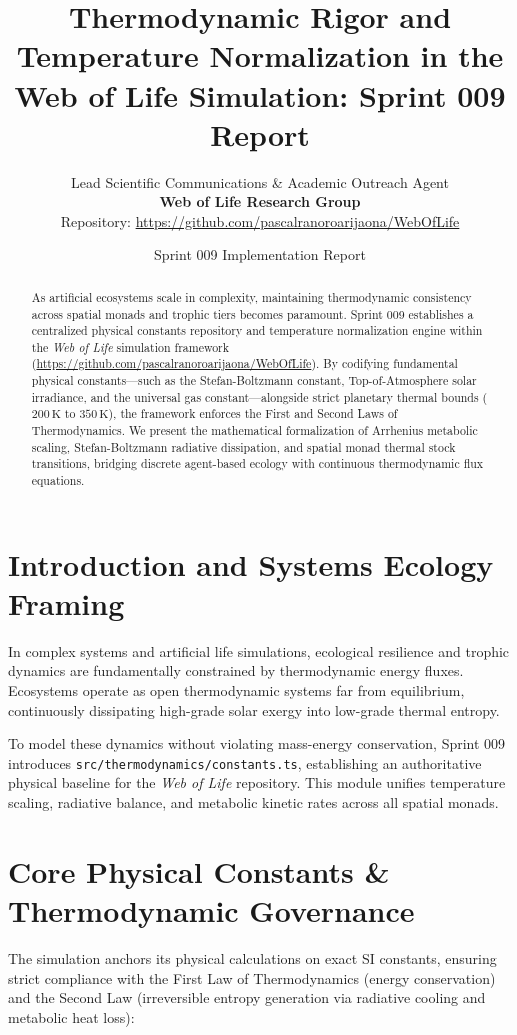\documentclass[11pt, a4paper]{article}
\title{\textbf{Thermodynamic Rigor and Temperature Normalization in the Web of Life Simulation: Sprint 009 Report}}
\author{
    Lead Scientific Communications \& Academic Outreach Agent \\
    \textbf{Web of Life Research Group} \\
    Repository: \url{https://github.com/pascalranoroarijaona/WebOfLife}
}
\date{Sprint 009 Implementation Report}
\begin{document}
\maketitle

\begin{abstract}
As artificial ecosystems scale in complexity, maintaining thermodynamic consistency across spatial monads and trophic tiers becomes paramount. Sprint 009 establishes a centralized physical constants repository and temperature normalization engine within the \textit{Web of Life} simulation framework (\url{https://github.com/pascalranoroarijaona/WebOfLife}). By codifying fundamental physical constants---such as the Stefan-Boltzmann constant, Top-of-Atmosphere solar irradiance, and the universal gas constant---alongside strict planetary thermal bounds ($200\,\text{K}$ to $350\,\text{K}$), the framework enforces the First and Second Laws of Thermodynamics. We present the mathematical formalization of Arrhenius metabolic scaling, Stefan-Boltzmann radiative dissipation, and spatial monad thermal stock transitions, bridging discrete agent-based ecology with continuous thermodynamic flux equations.
\end{abstract}

\section{Introduction and Systems Ecology Framing}
In complex systems and artificial life simulations, ecological resilience and trophic dynamics are fundamentally constrained by thermodynamic energy fluxes. Ecosystems operate as open thermodynamic systems far from equilibrium, continuously dissipating high-grade solar exergy into low-grade thermal entropy. 

To model these dynamics without violating mass-energy conservation, Sprint 009 introduces \texttt{src/thermodynamics/constants.ts}, establishing an authoritative physical baseline for the \textit{Web of Life} repository. This module unifies temperature scaling, radiative balance, and metabolic kinetic rates across all spatial monads.

\section{Core Physical Constants \& Thermodynamic Governance}
The simulation anchors its physical calculations on exact SI constants, ensuring strict compliance with the First Law of Thermodynamics (energy conservation) and the Second Law (irreversible entropy generation via radiative cooling and metabolic heat loss):
\end{document}
